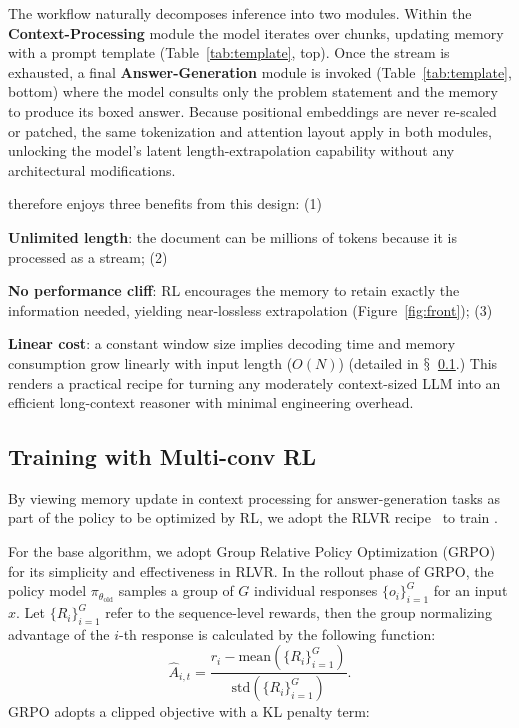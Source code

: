 The workflow naturally decomposes inference into two modules.
Within the \textbf{Context-Processing} module the model iterates over chunks, updating memory with a prompt template (Table~\ref{tab:template}, top).
Once the stream is exhausted, a final \textbf{Answer-Generation} module is invoked (Table~\ref{tab:template}, bottom) where the model consults only the problem statement and the memory to produce its boxed answer.
Because positional embeddings are never re-scaled or patched, the same tokenization and attention layout apply in both modules, unlocking the model's latent length-extrapolation capability without any architectural modifications.

\method therefore enjoys three benefits from this design:
(1) {\textbf{Unlimited length}: the document can be millions of tokens because it is processed as a stream;
(2) {\textbf{No performance cliff}: RL encourages the memory to retain exactly the information needed, yielding near-lossless extrapolation (Figure~\ref{fig:front});
(3) {\textbf{Linear cost}: a constant window size implies decoding time and memory consumption grow linearly with input length ($O(N)$) (detailed in $\mathsection$~\ref{sec:training}.)
This renders a practical recipe for turning any moderately context-sized LLM into an efficient long-context reasoner with minimal engineering overhead.



\subsection{Training \method with Multi-conv RL}
\label{sec:training}

By viewing memory update in context processing for answer-generation tasks as part of the policy to be optimized by RL, we adopt the RLVR recipe~\cite{o1,guo2025deepseek,seed2025seed1} to train \method.


For the base algorithm, we adopt Group Relative Policy Optimization (GRPO)~\cite{deepseekmath} for its simplicity and effectiveness in RLVR. 
In the rollout phase of GRPO, the policy model $\pi_{\theta_\text{old}}$ samples a group of $G$ individual responses $\{ o_i\}_{i=1}^G$ for an input $x$. Let $\{ R_i \}_{i=1}^G$ refer to the sequence-level rewards, then the group normalizing advantage of the $i$-th response is calculated by the following function:
\begin{equation}
\hat{A}_{i,t} = \frac{r_i - \text{mean}(\{R_i\}_{i=1}^G)}{\text{std}(\{R_i\}_{i=1}^G)}.
\end{equation}
GRPO adopts a clipped objective with a KL penalty term:

}}}
